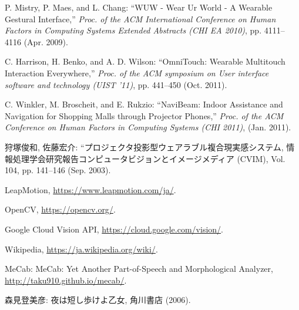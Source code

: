 \begin{thebibliography}{99}
	P. Mistry, P. Maes, and L. Chang: ``WUW - Wear Ur World - A Wearable Gestural Interface,'' {\it Proc. of the ACM International Conference on Human Factors in Computing Systems Extended Abstracts (CHI EA 2010)}, pp. 4111--4116 (Apr. 2009).
	
	C. Harrison, H. Benko, and A. D. Wilson: ``OmniTouch: Wearable Multitouch Interaction Everywhere,'' {\it Proc. of the ACM symposium on User interface software and technology (UIST '11)}, pp. 441--450 (Oct. 2011).
	
	C. Winkler, M. Broscheit, and E. Rukzio: ``NaviBeam: Indoor Assistance and Navigation for Shopping Malls through Projector Phones,'' {\it Proc. of the ACM Conference on Human Factors in Computing Systems (CHI 2011)}, (Jan. 2011).
	
	
	  狩塚俊和, 佐藤宏介: ``プロジェクタ投影型ウェアラブル複合現実感システム, 情報処理学会研究報告コンピュータビジョンとイメージメディア (CVIM), Vol. 104, pp. 141--146 (Sep. 2003).
	  
	LeapMotion, \url{https://www.leapmotion.com/ja/}.
	
	OpenCV, \url{https://opencv.org/}.
	
	Google Cloud Vision API, \url{https://cloud.google.com/vision/}.
	
	Wikipedia, \url{https://ja.wikipedia.org/wiki/}.
			
	MeCab: MeCab: Yet Another Part-of-Speech and Morphological Analyzer,  \url{http://taku910.github.io/mecab/}.
	
	森見登美彦: 夜は短し歩けよ乙女, 角川書店 (2006).

	
\end{thebibliography}